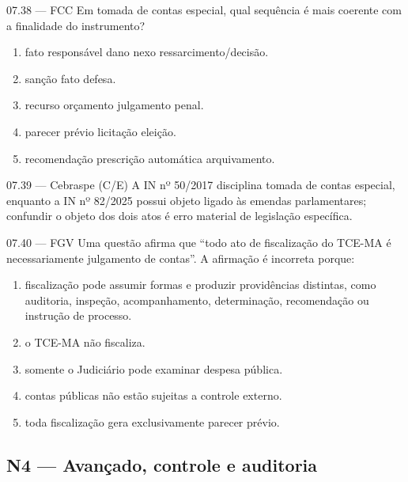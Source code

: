 \begin{questao}{ 07.38 — FCC}
Em tomada de contas especial, qual sequência é mais coerente com a finalidade do instrumento?
\begin{enumerate}[label=\Alph*)]
\item fato \textrightarrow responsável \textrightarrow dano \textrightarrow nexo \textrightarrow ressarcimento/decisão.
\item sanção \textrightarrow fato \textrightarrow defesa.
\item recurso \textrightarrow orçamento \textrightarrow julgamento penal.
\item parecer prévio \textrightarrow licitação \textrightarrow eleição.
\item recomendação \textrightarrow prescrição automática \textrightarrow arquivamento.
\end{enumerate}
\end{questao}

\begin{questao}{ 07.39 — Cebraspe (C/E)}
A IN nº 50/2017 disciplina tomada de contas especial, enquanto a IN nº 82/2025 possui objeto ligado às emendas parlamentares; confundir o objeto dos dois atos é erro material de legislação específica.
\end{questao}

\begin{questao}{ 07.40 — FGV}
Uma questão afirma que “todo ato de fiscalização do TCE-MA é necessariamente julgamento de contas”. A afirmação é incorreta porque:
\begin{enumerate}[label=\Alph*)]
\item fiscalização pode assumir formas e produzir providências distintas, como auditoria, inspeção, acompanhamento, determinação, recomendação ou instrução de processo.
\item o TCE-MA não fiscaliza.
\item somente o Judiciário pode examinar despesa pública.
\item contas públicas não estão sujeitas a controle externo.
\item toda fiscalização gera exclusivamente parecer prévio.
\end{enumerate}
\end{questao}

\subsection*{N4 — Avançado, controle e auditoria}

